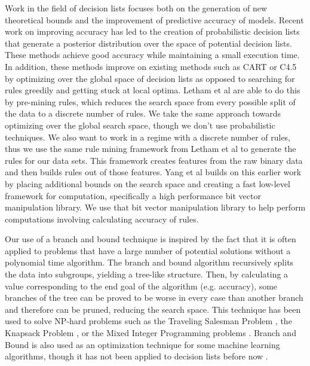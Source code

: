 Work in the field of decision lists focuses both on the generation of new theoretical bounds and the improvement of predictive accuracy of models.
Recent work on improving accuracy has led to the creation of probabilistic decision lists that generate a posterior distribution over the space of potential decision lists\cite{LethamRuMcMa15,YangRuSe16}.
These methods achieve good accuracy while maintaining a small execution time.
In addition, these methods improve on existing methods such as CART or C4.5 by optimizing over the global space of decision lists as opposed to searching for rules greedily and getting stuck at local optima.
Letham et al are able to do this by pre-mining rules, which reduces the search space from every possible split of the data to a discrete number of rules.
We take the same approach towards optimizing over the global search space, though we don’t use probabilistic techniques.
We also want to work in a regime with a discrete number of rules, thus we use the same rule mining framework from Letham et al to generate the rules for our data sets.
This framework creates features from the raw binary data and then builds rules out of those features.
Yang et al builds on this earlier work by placing additional bounds on the search space and creating a fast low-level framework for computation, specifically a high performance bit vector manipulation library.
We use that bit vector manipulation library to help perform computations involving calculating accuracy of rules.

Our use of a branch and bound technique is inspired by the fact that it is often applied to problems that have a large number of potential solutions without a polynomial time algorithm.
The branch and bound algorithm recursively splits the data into subgroups, yielding a tree-like structure.
Then, by calculating a value corresponding to the end goal of the algorithm (e.g. accuracy), some branches of the tree can be proved to be worse in every case than another branch and therefore can be pruned, reducing the search space.
This technique has been used to solve NP-hard problems such as the Traveling Salesman Problem \cite{LittleMuSwKa63}, the Knapsack Problem \cite{Kolesar67}, or the Mixed Integer Programming problems \cite{Clausen99}.
Branch and Bound is also used as an optimization technique for some machine learning algorithms, though it has not been applied to decision lists before now \cite{ChapelleSiKe06}.